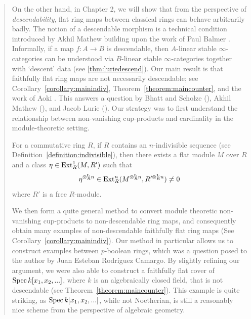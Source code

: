 \begin{abstract}
On the other hand, in Chapter 2, we will show that from the perspective of \textit{descendability}, flat ring maps between classical rings can behave 
arbitrarily badly. The notion of a descendable morphism is a technical condition introduced by Akhil Mathew \cite{DescendMathew} 
building upon the work of Paul Balmer \cite{DescendBalmer}. Informally, if a map $f: A \to B$ is descendable, then $A$-linear stable $\infty$-categories can
be understood via $B$-linear stable $\infty$-categories together with `descent' data (see \ref{thm:luriedescend}). Our main result is that 
faithfully flat ring maps are not necessarily descendable; see Corollary~\ref{corollary:mainindiv}, Theorem~\ref{theorem:maincounter}, and the work of Aoki \cite{aoki}. 
This answers a question by Bhatt and Scholze (\cite[11.24]{BhattScholzeProj}), Akhil Mathew (\cite[Prop. 3.32]{DescendMathew}), and Jacob Lurie (\cite[D.3.3.4]{LurieSAG}). 
Our strategy was to first understand the relationship between non-vanishing cup-products and cardinality in the module-theoretic setting.
\begin{theorem}
For a commutative ring $R$, if
$R$ contains an $n$-indivisible sequence (see Definition~\ref{definition:indivisible}), then 
there exists a flat module $M$ over $R$ and a class $\eta \in \Ext^1_R(M, R')$ such that 
\[\eta^{\otimesl_R n} \in \Ext^n_R(M^{\otimesl_R n}, R'^{\otimesl_R n}) \neq 0\]
where $R'$ is a free $R$-module.
\end{theorem}
We then form a quite general method to convert module theoretic non-vanishing cup-products to non-descendable ring maps, and consequently obtain many examples of non-descendable faithfully flat ring maps (See Corollary~\ref{corollary:mainindiv}).
Our method in particular allows us to construct examples between $p$-boolean rings, which was a question posed to the author by Juan Esteban Rodríguez Camargo. By slightly refining our argument, we were also able to construct a faithfully flat cover of $\spec{k[x_1,x_2,...]}$, where $k$ is an algebraically closed field, that is not descendable (see Theorem~\ref{theorem:maincounter}).
This example is quite striking, as $\spec{k[x_1,x_2,...]}$, while not Noetherian, is still a reasonably nice scheme from the perspective of algebraic geometry.\\


\end{abstract}
